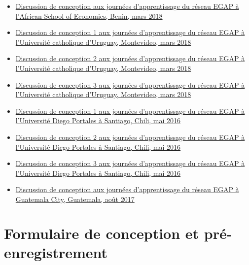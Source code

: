 \documentclass[12pt,]{book}
\begin{document}
\begin{itemize}
\item
  \href{https://egap.github.io/learningdays-resources/Slides/Examples/research_design_2-benin.pdf}{Discussion de conception aux journées d'apprentissage du réseau EGAP à l'African School of Economics, Benin, mars 2018}
\item
  \href{https://egap.github.io/learningdays-resources/Slides/Examples/research_design_1-montevideo.pdf}{Discussion de conception 1 aux journées d'apprentissage du réseau EGAP à l'Université catholique d'Uruguay, Montevideo, mars 2018}
\item
  \href{https://egap.github.io/learningdays-resources/Slides/Examples/research_design_2-montevideo.pdf}{Discussion de conception 2 aux journées d'apprentissage du réseau EGAP à l'Université catholique d'Uruguay, Montevideo, mars 2018}
\item
  \href{https://egap.github.io/learningdays-resources/Slides/Examples/research_design_3-montevideo.pdf}{Discussion de conception 3 aux journées d'apprentissage du réseau EGAP à l'Université catholique d'Uruguay, Montevideo, mars 2018}
\item
  \href{https://egap.github.io/learningdays-resources/Slides/Examples/research_design_1-santiago.pdf}{Discussion de conception 1 aux journées d'apprentissage du réseau EGAP à l'Université Diego Portales à Santiago, Chili, mai 2016}
\item
  \href{https://egap.github.io/learningdays-resources/Slides/Examples/research_design_2-santiago.pdf}{Discussion de conception 2 aux journées d'apprentissage du réseau EGAP à l'Université Diego Portales à Santiago, Chili, mai 2016}
\item
  \href{https://egap.github.io/learningdays-resources/Slides/Examples/research_design_3-santiago.pdf}{Discussion de conception 3 aux journées d'apprentissage du réseau EGAP à l'Université Diego Portales à Santiago, Chili, mai 2016}
\item
  \href{https://egap.github.io/learningdays-resources/Slides/Examples/research_design-guatemala.pdf}{Discussion de conception aux journées d'apprentissage du réseau EGAP à Guatemala City, Guatemala, août 2017}
\end{itemize}

\hypertarget{formulaire-de-conception-et-pruxe9-enregistrement}{%
\section{Formulaire de conception et pré-enregistrement}\label{formulaire-de-conception-et-pruxe9-enregistrement}}
\end{document}
